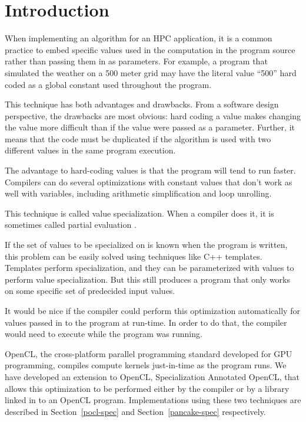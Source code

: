 \documentclass{acm_proc_article-sp}
\begin{document}

\section{Introduction}

When implementing an algorithm for an HPC application, it is a common practice
to embed specific values used in the computation in the program source rather
than passing them in as parameters. For example, a program that simulated the
weather on a 500 meter grid may have the literal value ``500'' hard coded as a
global constant used throughout the program.

This technique has both advantages and drawbacks. From a software design
perspective, the drawbacks are most obvious: hard coding a value makes changing
the value more difficult than if the value were passed as a parameter. Further,
it means that the code must be duplicated if the algorithm is used with two
different values in the same program execution. 

The advantage to hard-coding values is that the program will tend to run faster.
Compilers can do several optimizations with constant values that don't work as
well with variables, including arithmetic simplification and loop unrolling.

This technique is called value specialization. When a compiler does it, it is
sometimes called partial evaluation \cite{Futamura:1971:PE}.

If the set of values to be specialized on is known when the program is written,
this problem can be easily solved using techniques like C++ templates.
Templates perform specialization, and they can be parameterized with values to
perform value specialization. But this still produces a program that only works
on some specific set of predecided input values.

It would be nice if the compiler could perform this optimization automatically
for values passed in to the program at run-time. In order to do that, the compiler
would need to execute while the program was running.

OpenCL, the cross-platform parallel programming standard developed for GPU
programming, compiles compute kernels just-in-time as the program runs. We have
developed an extension to OpenCL, Specialization Annotated OpenCL, that allows
this optimization to be performed either by the compiler or by a library linked
in to an OpenCL program. Implementations using these two techniques are
described in Section~\ref{pocl-spec} and Section~\ref{pancake-spec}
respectively.
\end{document}
